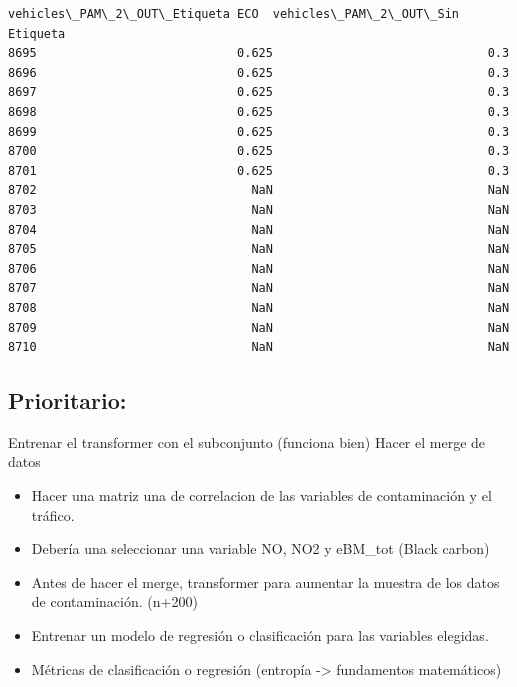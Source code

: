 \documentclass[11pt]{article}
\providecommand{\tightlist}{%
      \setlength{\itemsep}{0pt}\setlength{\parskip}{0pt}}
\begin{document}
\begin{tcolorbox}[breakable, size=fbox, boxrule=.5pt, pad at break*=1mm, opacityfill=0]
\begin{Verbatim}[commandchars=\\\{\}]
      vehicles\_PAM\_2\_OUT\_Etiqueta ECO  vehicles\_PAM\_2\_OUT\_Sin Etiqueta
8695                            0.625                              0.3
8696                            0.625                              0.3
8697                            0.625                              0.3
8698                            0.625                              0.3
8699                            0.625                              0.3
8700                            0.625                              0.3
8701                            0.625                              0.3
8702                              NaN                              NaN
8703                              NaN                              NaN
8704                              NaN                              NaN
8705                              NaN                              NaN
8706                              NaN                              NaN
8707                              NaN                              NaN
8708                              NaN                              NaN
8709                              NaN                              NaN
8710                              NaN                              NaN
\end{Verbatim}
\end{tcolorbox}
        
    \hypertarget{prioritario}{%
\subsection{Prioritario:}\label{prioritario}}

Entrenar el transformer con el subconjunto (funciona bien) Hacer el
merge de datos

\begin{itemize}
\tightlist
\item
  Hacer una matriz una de correlacion de las variables de contaminación
  y el tráfico.
\item
  Debería una seleccionar una variable NO, NO2 y eBM\_tot (Black carbon)
\item
  Antes de hacer el merge, transformer para aumentar la muestra de los
  datos de contaminación. (n+200)
\item
  Entrenar un modelo de regresión o clasificación para las variables
  elegidas.
\item
  Métricas de clasificación o regresión (entropía -\textgreater{}
  fundamentos matemáticos)
\end{itemize}
\end{document}
